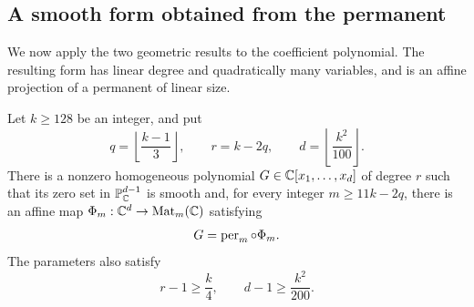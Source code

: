 \subsection{A smooth form obtained from the permanent}

We now apply the two geometric results to the coefficient polynomial.
The resulting form has linear degree and quadratically many variables,
and is an affine projection of a permanent of linear size.

\begin{samepage}
\begin{proposition}
Let \(k\ge128\) be an integer\label{prop:smooth-projection}, and put
\[
 q=\left\lfloor\frac{k-1}{3}\right\rfloor,\qquad
 r=k-2q,\qquad d=\left\lfloor\frac{k^2}{100}\right\rfloor.
\]
There is a nonzero homogeneous polynomial
\(G\in\mathbb C[x_1,\ldots,x_d]\) of degree \(r\) such that its zero set in
\(\mathbb P^{d-1}_{\mathbb C}\) is smooth and, for every integer \(m\ge11k-2q\),
there is an affine map \(\Phi_m:\mathbb C^d\to\operatorname{Mat}_m(\mathbb C)\) satisfying
\[
 G=\operatorname{per}_m\circ\Phi_m.
\]
The parameters also satisfy
\[
 r-1\ge\frac{k}{4},\qquad d-1\ge\frac{k^2}{200}.
\]
\end{proposition}
\end{samepage}

